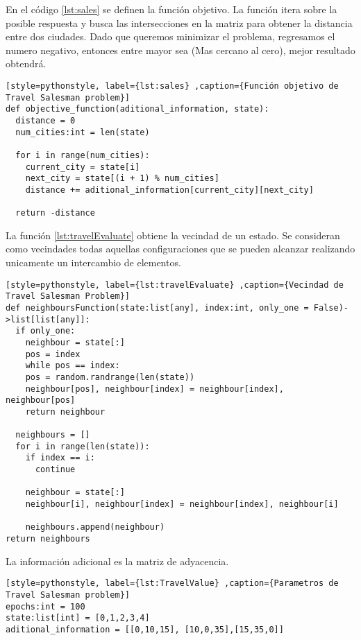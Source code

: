 \documentclass[12pt,twoside]{article}
\begin{document}
En el código \ref{lst:sales} se definen la función objetivo. La función itera sobre la posible respuesta y busca las intersecciones en la matriz para obtener la distancia entre dos ciudades. Dado que queremos minimizar el problema, regresamos el numero negativo, entonces entre mayor sea (Mas cercano al cero), mejor resultado obtendrá.

\begin{lstlisting}[style=pythonstyle, label={lst:sales} ,caption={Función objetivo de Travel Salesman problem}]
def objective_function(aditional_information, state):
  distance = 0
  num_cities:int = len(state)

  for i in range(num_cities):
    current_city = state[i]
    next_city = state[(i + 1) % num_cities]  
    distance += aditional_information[current_city][next_city]

  return -distance
\end{lstlisting}

La función \ref{lst:travelEvaluate} obtiene la vecindad de un estado. Se consideran como vecindades todas aquellas configuraciones que se pueden alcanzar realizando unicamente un intercambio de elementos.

\begin{lstlisting}[style=pythonstyle, label={lst:travelEvaluate} ,caption={Vecindad de Travel Salesman Problem}]
def neighboursFunction(state:list[any], index:int, only_one = False)->list[list[any]]:
  if only_one:
    neighbour = state[:]
    pos = index
    while pos == index:    
    pos = random.randrange(len(state))
    neighbour[pos], neighbour[index] = neighbour[index], neighbour[pos]
    return neighbour

  neighbours = []
  for i in range(len(state)):
    if index == i:
      continue

    neighbour = state[:]
    neighbour[i], neighbour[index] = neighbour[index], neighbour[i]

    neighbours.append(neighbour)        
return neighbours
\end{lstlisting}

La información adicional es la matriz de adyacencia.

\begin{lstlisting}[style=pythonstyle, label={lst:TravelValue} ,caption={Parametros de Travel Salesman problem}]
epochs:int = 100
state:list[int] = [0,1,2,3,4]
aditional_information = [[0,10,15], [10,0,35],[15,35,0]] 
\end{lstlisting}
\end{document}
